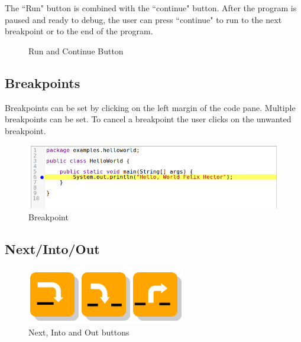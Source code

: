 \documentclass[11pt, a4paper]{article}
\begin{document}
The ``Run" button is combined with the ``continue" button.
After the program is paused and ready to debug, the user can press ``continue" to run to the next breakpoint or to the end of the program.
\begin{figure}[h!]
\centering
{}
\quad
{}
\caption{Run and Continue Button}
\end{figure}

\subsection{Breakpoints}
Breakpoints can be set by clicking on the left margin of the code pane.
Multiple breakpoints can be set.
To cancel a breakpoint the user clicks on the unwanted breakpoint.
\begin{figure}[h!]
\centering
\includegraphics[width=\textwidth]{breakpoint.png}
\caption{Breakpoint}
\label{fig:breakpoint}
\end{figure}
\subsection{Next/Into/Out}
\begin{figure}[h!]
\centering
\includegraphics[scale=0.6]{buttons.png}
\caption{Next, Into and Out buttons}
\label{fig:buttons}
\end{figure}
\end{document}

